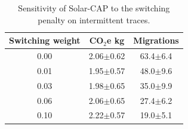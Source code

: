 \begin{table}[t]
\centering
\caption{Sensitivity of Solar-CAP to the switching penalty on intermittent traces.}
\label{tab:sensitivity}
\begin{tabular}{ccc}
\toprule
\textbf{Switching weight} & \textbf{CO$_2$e kg} & \textbf{Migrations} \\
\midrule
0.00 & 2.06$\pm$0.62 & 63.4$\pm$6.4 \\
0.01 & 1.95$\pm$0.57 & 48.0$\pm$9.6 \\
0.03 & 1.98$\pm$0.65 & 35.0$\pm$9.9 \\
0.06 & 2.06$\pm$0.65 & 27.4$\pm$6.2 \\
0.10 & 2.22$\pm$0.57 & 19.0$\pm$5.1 \\
\bottomrule
\end{tabular}
\end{table}
